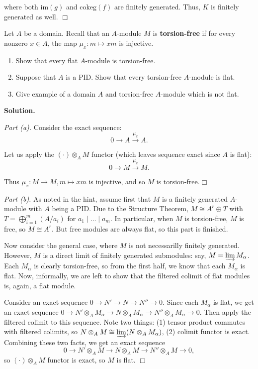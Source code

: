 \documentclass{template}
\newcommand{\qedwhite}{\hfill \ensuremath{\Box}}
\begin{document}
where both $\text{im}(g)$ and $\text{cokeg}(f)$ are finitely generated. Thus,
$K$ is finitely generated as well. \qedwhite

\begin{problem}[Exercise 3]
    Let $A$ be a domain. Recall that an $A$-module $M$ is \textbf{torsion-free}
if for every nonzero $x \in A$, the map $\mu_x: m \mapsto xm$ is injective.
\begin{enumerate}
    \item[(a)] Show that every flat $A$-module is torsion-free.
    \item[(b)] Suppose that $A$ is a PID. Show that every torsion-free
    $A$-module is flat.
    \item[(c)] Give example of a domain $A$ and torsion-free $A$-module which is not flat.
\end{enumerate}
\end{problem}

\textbf{Solution.}

\textit{Part (a).} Consider the exact sequence:
\begin{equation*}
    0 \to A \xrightarrow{\mu_x} A.
\end{equation*}

Let us apply the $(\cdot) \otimes_A M$ functor (which leaves sequence exact since
$A$ is flat):
\begin{equation*}
    0 \to M \xrightarrow{\mu_x} M.
\end{equation*}

Thus $\mu_x: M \to M, m \mapsto xm$ is injective, and so $M$ is torsion-free.\qedwhite

\textit{Part (b).} As noted in the hint, assume first that $M$ is a finitely
generated $A$-module with $A$ being a PID. Due to the Structure Theorem, $M
\cong A^r \oplus T$ with $T = \bigoplus_{i=1}^m (A/a_i)$ for $a_1 \mid \dots
\mid a_m$. In particular, when $M$ is torsion-free, $M$ is free, so $M \cong
A^r$. But free modules are always flat, so this part is finished.

Now consider the general case, where $M$ is not necessarilly finitely generated.
However, $M$ is a direct limit of finitely generated submodules: say, $M =
\varinjlim M_{\alpha}$. Each $M_{\alpha}$ is clearly torsion-free, so from the
first half, we know that each $M_{\alpha}$ is flat. Now, informally, we are left
to show that the filtered colimit of flat modules is, again, a flat module.

Consider an exact sequence $0 \to N' \to N \to N'' \to 0$. Since each
$M_{\alpha}$ is flat, we get an exact sequence $0 \to N' \otimes_A M_{\alpha} \to
N \otimes_A M_{\alpha} \to N'' \otimes_A M_{\alpha} \to 0$. Then apply the
filtered colimit to this sequence. Note two things: (1) tensor product commutes
with filtered colimits, so $N \otimes_A M \cong \varinjlim (N \otimes_A
M_{\alpha})$, (2) colimit functor is exact. Combining these two facts, we get 
an exact sequence
\begin{equation*}
    0 \to N' \otimes_A M \to N \otimes_A M \to N'' \otimes_A M \to 0,
\end{equation*}
so $(\cdot) \otimes_A M$ functor is exact, so $M$ is flat. \qedwhite
\end{document}

